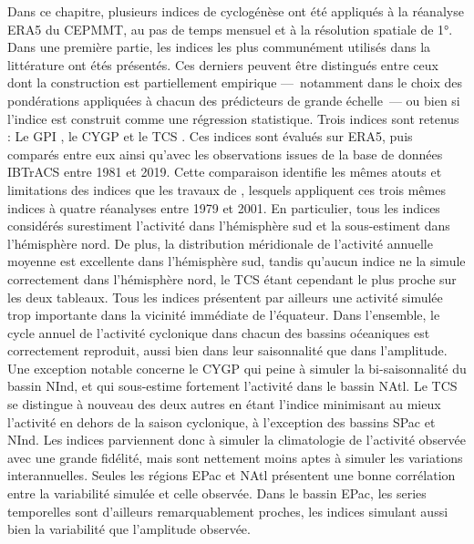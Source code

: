 \documentclass[../main.tex]{subfiles}
\begin{document}
Dans ce chapitre, plusieurs indices de cyclogénèse ont été appliqués à la réanalyse ERA5 du CEPMMT, au pas de temps mensuel et à la résolution spatiale de
\ang{1}. Dans une première partie, les indices les plus communément utilisés dans la littérature ont étés présentés. Ces derniers peuvent être distingués entre
ceux dont la construction est partiellement empirique ---~notamment dans le choix des pondérations appliquées à chacun des prédicteurs de grande échelle~--- ou
bien si l'indice est construit comme une régression statistique. Trois indices sont retenus : Le GPI \parencite{emanuel_tropical_2004}, le CYGP
\parencite{royer_gcm_1998} et le TCS \parencite{tippett_poisson_2011}. Ces indices sont évalués sur ERA5, puis comparés entre eux ainsi qu'avec les observations
issues de la base de données IBTrACS entre \num{1981} et \num{2019}. Cette comparaison identifie les mêmes atouts et limitations des indices que les travaux de
\textcite{menkes_comparison_2012}, lesquels appliquent ces trois mêmes indices à quatre réanalyses entre \num{1979} et \num{2001}. En particulier, tous les
indices considérés surestiment l'activité dans l'hémisphère sud et la sous-estiment dans l'hémisphère nord. De plus, la distribution méridionale de l'activité
annuelle moyenne est excellente dans l'hémisphère sud, tandis qu'aucun indice ne la simule correctement dans l'hémisphère nord, le TCS étant cependant le plus
proche sur les deux tableaux. Tous les indices présentent par ailleurs une activité simulée trop importante dans la vicinité immédiate de l'équateur. Dans
l'ensemble, le cycle annuel de l'activité cyclonique dans chacun des bassins oćeaniques est correctement reproduit, aussi bien dans leur saisonnalité que dans
l'amplitude. Une exception notable concerne le CYGP qui peine à simuler la bi-saisonnalité du bassin NInd, et qui sous-estime fortement l'activité dans le
bassin NAtl. Le TCS se distingue à nouveau des deux autres en étant l'indice minimisant au mieux l'activité en dehors de la saison cyclonique, à l'exception des
bassins SPac et NInd. Les indices parviennent donc à simuler la climatologie de l'activité observée avec une grande fidélité, mais sont nettement moins aptes à
simuler les variations interannuelles. Seules les régions EPac et NAtl présentent une bonne corrélation entre la variabilité simulée et celle observée. Dans le
bassin EPac, les series temporelles sont d'ailleurs remarquablement proches, les indices simulant aussi bien la variabilité que l'amplitude observée.
\end{document}
